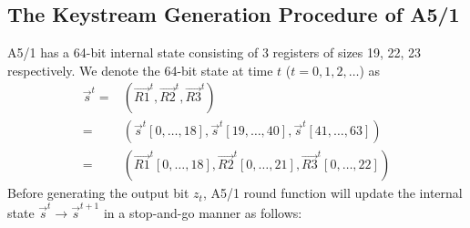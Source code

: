 \subsection{The Keystream Generation Procedure of A5/1}\label{sec:KSMA51}
A5/1 has a 64-bit internal state consisting of 3 registers of sizes 19, 22, 23 respectively.
We denote the 64-bit state at time $t$ ($t=0,1,2,\ldots$) as
\begin{equation}\label{eq:StateAndRi}
\begin{aligned}
   \vec s^t= & (\vec{R1}^t, \vec{R2}^t, \vec{R3}^t)\\
     =& (\vec{s}^t[0,\ldots, 18],\vec{s}^t[19,\ldots, 40],\vec{s}^t[41,\ldots, 63])\\
     =&(\vec{R1}^t[0,\ldots,18],\vec{R2}^t[0,\ldots, 21],\vec{R3}^t[0,\ldots,22])
\end{aligned}
\end{equation}
Before generating the output bit $z_t$, A5/1 round function will update the internal state $\vec{s}^t\rightarrow \vec{s}^{t+1}$ in a stop-and-go manner as follows:
